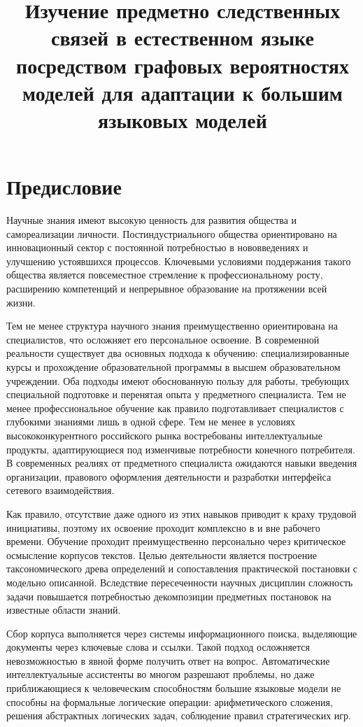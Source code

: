 \documentclass{article}
\begin{document}
\title{Изучение предметно следственных связей в естественном языке посредством графовых вероятностях моделей для адаптации к большим языковых моделей}

\section{Предисловие}

Научные знания имеют высокую ценность для развития общества и самореализации личности.
Постиндустриального общества ориентировано на инновационный сектор с постоянной потребностью
в нововведениях и улучшению устоявшихся процессов. Ключевыми условиями  поддержания 
такого общества является повсеместное стремление к профессиональному росту, расширению компетенций
и непрерывное образование на протяжении всей жизни. 

Тем не менее структура научного знания преимущественно ориентирована на специалистов, что осложняет его
персональное освоение. В современной реальности существует два основных подхода к обучению: специализированные курсы
и прохождение образовательной программы в высшем образовательном учреждении. Оба подходы 
имеют обоснованную пользу для работы, требующих
специальной подготовке и перенятая опыта у предметного специалиста. Тем не менее
профессиональное обучение как правило подготавливает специалистов с глубокими знаниями лишь в одной сфере.
Тем не менее в условиях высококонкурентного российского рынка востребованы
интеллектуальные продукты, адаптирующиеся под изменчивые потребности конечного потребителя.
В современных реалиях от предметного специалиста ожидаются навыки введения организации, 
правового оформления деятельности и разработки интерфейса сетевого взаимодействия. 

Как правило, отсутствие даже одного из этих навыков приводит к краху 
трудовой инициативы, поэтому их освоение проходит комплексно в и вне рабочего времени. 
Обучение проходит преимущественно персонально через критическое 
осмысление корпусов текстов. Целью деятельности является построение 
таксономического древа определений и сопоставления практической постановки с модельно описанной. 
Вследствие пересеченности научных дисциплин сложность задачи повышается потребностью декомпозиции предметных постановок
на известные области знаний. 

Сбор корпуса выполняется через системы информационного поиска, выделяющие документы через
ключевые слова и ссылки. Такой подход осложняется невозможностью в явной форме получить ответ на вопрос.  
Автоматические интеллектуальные ассистенты во многом разрешают проблемы, но даже приближающиеся к человеческим способностям
большие языковые модели не способны на формальные логические операции: арифметического сложения, решения абстрактных логических задач, соблюдение 
правил стратегических игр.
\end{document}
